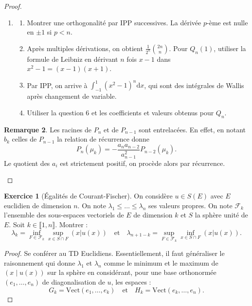 \documentclass[french]{article}
\newcommand{\Vect}{\text{Vect}}
\renewcommand{\d}{\text{d}}
\theoremstyle{definition}
\newtheorem{exo}{Exercice}
\newtheorem*{rmq}{Remarque}
\begin{document}
\begin{proof}
\begin{enumerate}
		\begin{rmq}
			L'égalité de Bessel est une CNS de densité.
		\end{rmq}
		\item \begin{enumerate}[label=(\alph*)]
			\item Montrer une orthogonalité par IPP successives. La dérivée $p$-ème est nulle en $\pm1$ si $p<n$.
			\item Après multiples dérivations, on obtient $\displaystyle\frac{1}{2^n}\binom{2n}{n}$. Pour $Q_n(1)$, utiliser la formule de Leibniz en dérivant $n$ fois $x-1$ dans $x^2-1=(x-1)(x+1)$.
			\item Par IPP, on arrive à $\displaystyle\int_{-1}^{1}(x^2-1)^n\d x$, qui sont des intégrales de Wallis après changement de variable.
			\item Utiliser la question $6$ et les coefficients et valeurs obtenus pour $Q_n$.
		\end{enumerate}
	\end{enumerate}
\begin{rmq}
	Les racines de $P_n$ et de $P_{n-1}$ sont entrelacées. En effet, en notant $b_k$ celles de $P_{n-1}$ la relation de récurrence donne
	$$P_n(\mu_k)=-\frac{a_na_{n-2}}{a_{n-1}^2}P_{n-2}(\mu_k).$$
	Le quotient des $a_i$ est strictement positif, on procède alors par récurrence.
\end{rmq}
\end{proof}

\begin{exo}[Égalités de Courant-Fischer]
	On considère $u\in S(E)$ avec $E$ euclidien de dimension $n$. On note $\lambda_1\leqslant\ldots\leqslant\lambda_n$ ses valeurs propres. On note $\mathcal{F}_k$ l'ensemble des sous-espaces vectoriels de $E$ de dimension $k$ et $S$ la sphère unité de $E$. Soit $k\in\llbracket1,n\rrbracket$. Montrer :  $$\lambda_k=\inf_{F\in\mathcal{F}_k}\sup_{x\in S\cap F}(x|u(x))\quad\text{et}\quad\lambda_{n+1-k}=\sup_{F\in\mathcal{F}_k}\inf_{x\in S\cap F}(x|u(x)).$$
\end{exo}
\begin{proof}
	Se conférer au TD Euclidiens. Essentiellement, il faut généraliser le raisonnement qui donne $\lambda_1$ et $\lambda_n$ comme le minimum et le maximum de $(x\mid u(x))$ sur la sphère en considérant, pour une base orthonormée $(e_1,\ldots,e_n)$ de diagonalisation de $u$, les espaces :
	$$G_k=\Vect(e_1,\ldots,e_k)\quad\text{et}\quad H_k=\Vect(e_k,\ldots,e_n).$$
\end{proof}
\end{document}
